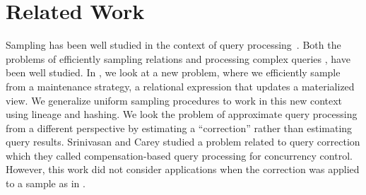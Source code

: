 \vspace{-1em}
\section{Related Work}\label{related}
\vspace{-.3em}



Sampling has been well studied in the context of query processing~\cite{AgarwalMPMMS13, olken1993random, garofalakis2001approximate}. 
Both the problems of efficiently sampling relations \cite{olken1993random} and processing complex queries \cite{agarwalknowing}, have been well studied. 
In \svc, we look at a new problem, where we efficiently sample from a maintenance strategy, a relational expression that updates a materialized view.
We generalize uniform sampling procedures to work in this new context using lineage \cite{DBLP:journals/vldb/CuiW03} and hashing.
We look the problem of approximate query processing \cite{AgarwalMPMMS13, agarwalknowing} from a different perspective by estimating a ``correction'' rather than estimating query results. 
Srinivasan and Carey studied a problem related to query correction which they called compensation-based query processing \cite{srinivasanC92} for concurrency control.
However, this work did not consider applications when the correction was applied to a sample as in \svc.

